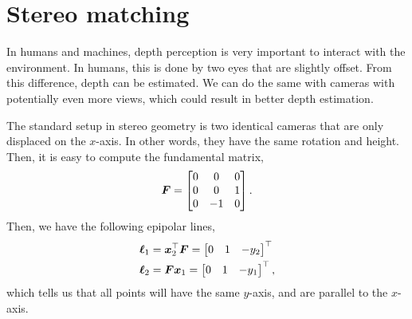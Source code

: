 \section{Stereo matching}

In humans and machines, depth perception is very important to interact with the
environment. In humans, this is done by two eyes that are slightly offset. From
this difference, depth can be estimated. We can do the same with cameras with
potentially even more views, which could result in better depth estimation.


The standard setup in stereo geometry is two identical cameras that are only
displaced on the $x$-axis. In other words, they have the same rotation and
height. Then, it is easy to compute the fundamental matrix, \[
    \bm{F} = \begin{bmatrix} 0 & 0 & 0 \\ 0 & 0 & 1 \\ 0 & -1 & 0 \end{bmatrix}.
\]
Then, we have the following epipolar lines,
\begin{align*}
    \bm{\ell}_1 & = \bm{x}_2^\top \bm{F} = \begin{bmatrix} 0 & 1 & -y_2 \end{bmatrix}^\top \\
    \bm{\ell}_2 & = \bm{F} \bm{x}_1 = \begin{bmatrix} 0 & 1 & -y_1 \end{bmatrix}^\top,
\end{align*}
which tells us that all points will have the same $y$-axis, and are parallel to
the $x$-axis.

